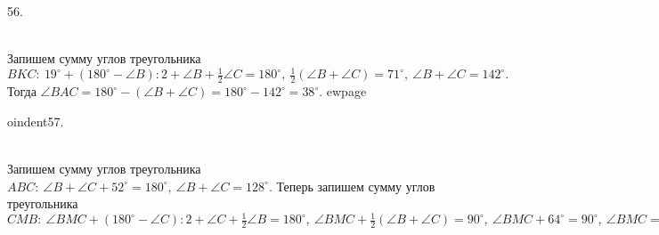 56. \begin{figure}[ht!]
\end{figure}\\
Запишем сумму углов треугольника $BKC:\ 19^\circ+(180^\circ-\angle B):2+\angle B+\frac{1}{2}\angle C=180^\circ,\ \frac{1}{2}(\angle B+\angle C)=71^\circ,\ \angle B+\angle C=142^\circ.$ Тогда $\angle BAC=180^\circ-(\angle B+\angle C)=180^\circ-142^\circ=38^\circ.$
ewpage

oindent57. \begin{figure}[ht!]
\end{figure}\\
Запишем сумму углов треугольника $ABC:\ \angle B+\angle C+52^\circ=180^\circ,\ \angle B+\angle C=128^\circ.$ Теперь запишем сумму углов треугольника $CMB:\ \angle BMC+(180^\circ-\angle C):2+\angle C+\frac{1}{2}\angle B=180^\circ,\ \angle BMC+\frac{1}{2}(\angle B+\angle C)=90^\circ,\ \angle BMC+64^\circ=90^\circ,\ \angle BMC=26^\circ.$\\
